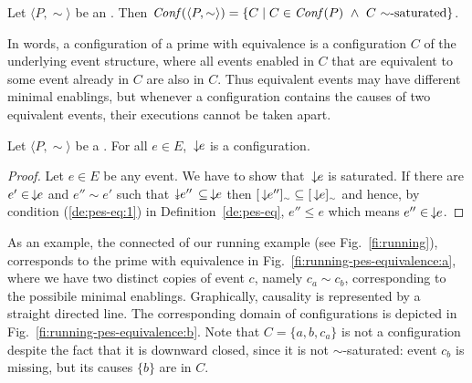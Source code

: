 
\begin{definition}[configurations]
  \label{de:epes-conf}
  Let $\langle P, \sim \rangle$ be an {\eseqabbr}. Then
  $\conf{\langle P, \sim \rangle} = \{ C \mid C \in \conf{P}\ \land\
  C\mbox{ $\sim$-saturated}\}$.
\end{definition}

In words, a configuration of a prime {\esabbr} with equivalence is a
configuration $C$ of the underlying event structure, where all events
enabled in $C$ that are equivalent to some event already in $C$ are also in
$C$. Thus equivalent events may have different minimal enablings,
but whenever a configuration contains the causes of two equivalent
events, their executions cannot be taken apart.


\begin{lemma}
  \label{le:hist-conf}
  Let $\langle P, \sim \rangle$ be a {\eseqabbr}. For all $e \in E$,
  $\causes{e}$ is a configuration.
\end{lemma}

\begin{proof}
  Let $e \in E$ be any event. We have to show that
  $\causes{e}$ is saturated. If there are
  $e' \in \causes{e}$ and $e'' \sim e'$ such that
  $\scauses{e''} \subseteq \causes{e}$ then
  $\eqclass[\sim]{\causes{e''}} \subseteq
  \eqclass[\sim]{\causes{e}}$ and hence, by condition (\ref{de:pes-eq:1}) in
  Definition~\ref{de:pes-eq}, $e'' \leq e$ which means
  $e'' \in \causes{e}$.
\end{proof}
   
As an example, the connected {\esabbr} of our running example (see
Fig.~\ref{fi:running}), corresponds to the prime {\esabbr} with
equivalence in {Fig.~\ref{fi:running-pes-equivalence:a}}, where we have two
distinct copies of event $c$, namely $c_a \sim c_b$, corresponding to
the possibile minimal enablings. Graphically, causality is represented
by a straight directed line. The corresponding domain of configurations is depicted in {Fig.~\ref{fi:running-pes-equivalence:b}}. Note that $C=\{ a, b, c_a\}$ is not a configuration despite the fact that it is {downward} closed, since it is not $\sim$-saturated: event $c_b$ is missing, but its causes {$\{b\}$} are in $C$.%

